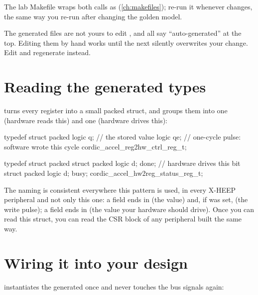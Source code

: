 The lab Makefile wraps both calls as 
(\cref{ch:makefiles}); re-run it whenever 
changes, the same way you re-run  after changing the
golden model.

\begin{gotcha}{The generated files are not yours to edit}
,  and
 all say ``auto-generated'' at the top. Editing
them by hand works until the next  silently overwrites your
change. Edit  and regenerate instead.
\end{gotcha}

\section{Reading the generated types}

 turns every register into a small packed struct, and groups
them into one  (hardware reads this) and one
 (hardware drives this):

\begin{svcode}[caption={rtl/cordic\_accel\_reg\_pkg.sv (generated, excerpt)}]
typedef struct packed {
  logic q;   // the stored value
  logic qe;  // one-cycle pulse: software wrote this cycle
} cordic_accel_reg2hw_ctrl_reg_t;

typedef struct packed {
  struct packed { logic d; } done;  // hardware drives this bit
  struct packed { logic d; } busy;
} cordic_accel_hw2reg_status_reg_t;
\end{svcode}

The naming is consistent everywhere this pattern is used, in every X-HEEP
peripheral and not only this one: a  field ends in 
(the value) and, if  was set,  (the write pulse); a
 field ends in  (the value your hardware should drive).
Once you can read this struct, you can read the CSR block of any peripheral
built the same way.

\section{Wiring it into your design}
\label{sec:regtool:wiring}

 instantiates the generated  once and
never touches the bus signals again:

